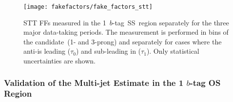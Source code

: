 

\begin{figure}[htbp]
  \centering

  \texttt{[image: fakefactors/fake\_factors\_stt]}

  \caption[FFs for events selected by STTs.]{STT FFs measured in the
    1~$b$-tag~SS~region separately for the three major data-taking periods. The
    measurement is performed in bins of the \tauhadvis candidate~\Ntracks (1-
    and 3-prong) and separately for cases where the anti-\tauhadvis is leading
    ($\tau_0$) and sub-leading in \pT ($\tau_1$). Only statistical uncertainties
    are shown.}%
  \label{fig:mjfakes_stt_ffs}
\end{figure}

\subsubsection{Validation of the Multi-jet Estimate in the 1 $b$-tag OS Region}

